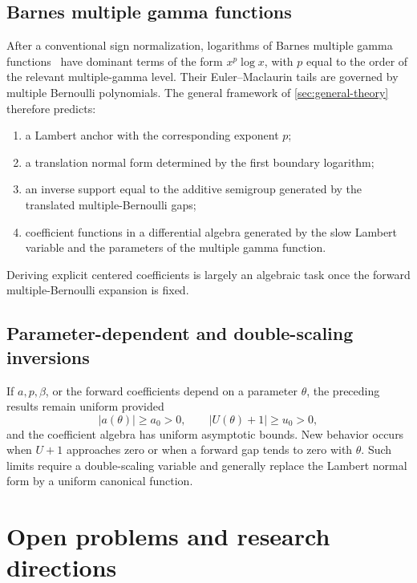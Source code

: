 \documentclass[11pt,oneside]{article}
\theoremstyle{plain}
\theoremstyle{definition}
\theoremstyle{remark}
\begin{document}
\subsection{Barnes multiple gamma functions}

After a conventional sign normalization, logarithms of Barnes multiple gamma
functions~\cite{Vardi1988} have dominant terms of the form \(x^p\log x\), with \(p\) equal to
the order of the relevant multiple-gamma level.  Their Euler--Maclaurin tails
are governed by multiple Bernoulli polynomials.  The general framework of
\cref{sec:general-theory} therefore predicts:
\begin{enumerate}
\item a Lambert anchor with the corresponding exponent \(p\);
\item a translation normal form determined by the first boundary logarithm;
\item an inverse support equal to the additive semigroup generated by the
      translated multiple-Bernoulli gaps;
\item coefficient functions in a differential algebra generated by the slow
      Lambert variable and the parameters of the multiple gamma function.
\end{enumerate}
Deriving explicit centered coefficients is largely an algebraic task once the
forward multiple-Bernoulli expansion is fixed.

\subsection{Parameter-dependent and double-scaling inversions}

If \(a,p,\beta\), or the forward coefficients depend on a parameter
\(\theta\), the preceding results remain uniform provided
\begin{equation}
 |a(\theta)|\ge a_0>0,
 \qquad
 |U(\theta)+1|\ge u_0>0,
 \label{eq:uniform-conditions}
\end{equation}
and the coefficient algebra has uniform asymptotic bounds.  New behavior occurs
when \(U+1\) approaches zero or when a forward gap tends to zero with
\(\theta\).  Such limits require a double-scaling variable and generally
replace the Lambert normal form by a uniform canonical function.

\section{Open problems and research directions}
\label{sec:research-directions}
\end{document}
